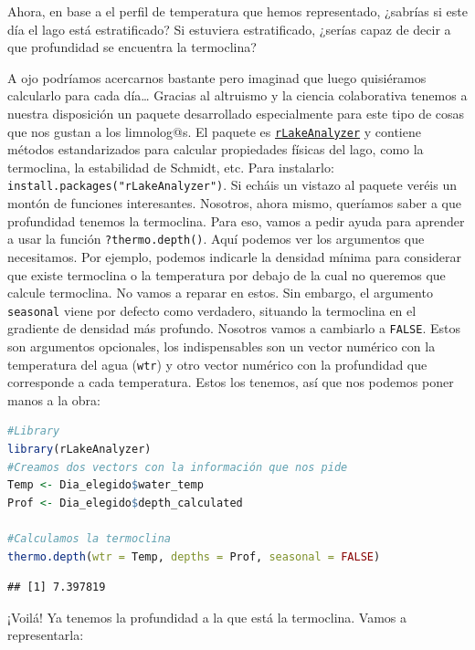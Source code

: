 \documentclass[
]{book}
\newcommand{\passthrough}[1]{#1}
\begin{document}
Ahora, en base a el perfil de temperatura que hemos representado, ¿sabrías si este día el lago está estratificado? Si estuviera estratificado, ¿serías capaz de decir a que profundidad se encuentra la termoclina?

A ojo podríamos acercarnos bastante pero imaginad que luego quisiéramos calcularlo para cada día\ldots{} Gracias al altruismo y la ciencia colaborativa tenemos a nuestra disposición un paquete desarrollado especialmente para este tipo de cosas que nos gustan a los limnolog@s. El paquete es \href{https://cran.r-project.org/web/packages/rLakeAnalyzer/rLakeAnalyzer.pdf}{\passthrough{\lstinline!rLakeAnalyzer!}} y contiene métodos estandarizados para calcular propiedades físicas del lago, como la termoclina, la estabilidad de Schmidt, etc. Para instalarlo: \passthrough{\lstinline!install.packages("rLakeAnalyzer")!}. Si echáis un vistazo al paquete veréis un montón de funciones interesantes. Nosotros, ahora mismo, queríamos saber a que profundidad tenemos la termoclina. Para eso, vamos a pedir ayuda para aprender a usar la función \passthrough{\lstinline!?thermo.depth()!}. Aquí podemos ver los argumentos que necesitamos. Por ejemplo, podemos indicarle la densidad mínima para considerar que existe termoclina o la temperatura por debajo de la cual no queremos que calcule termoclina. No vamos a reparar en estos. Sin embargo, el argumento \passthrough{\lstinline!seasonal!} viene por defecto como verdadero, situando la termoclina en el gradiente de densidad más profundo. Nosotros vamos a cambiarlo a \passthrough{\lstinline!FALSE!}. Estos son argumentos opcionales, los indispensables son un vector numérico con la temperatura del agua (\passthrough{\lstinline!wtr!}) y otro vector numérico con la profundidad que corresponde a cada temperatura. Estos los tenemos, así que nos podemos poner manos a la obra:

\begin{lstlisting}[language=R]
#Library
library(rLakeAnalyzer)
#Creamos dos vectors con la información que nos pide
Temp <- Dia_elegido$water_temp
Prof <- Dia_elegido$depth_calculated

#Calculamos la termoclina
thermo.depth(wtr = Temp, depths = Prof, seasonal = FALSE)
\end{lstlisting}

\begin{lstlisting}
## [1] 7.397819
\end{lstlisting}

¡Voilá! Ya tenemos la profundidad a la que está la termoclina. Vamos a representarla:
\end{document}
